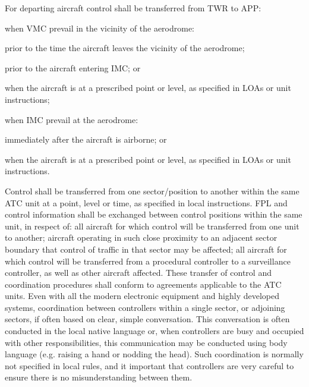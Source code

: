 For departing aircraft control shall be transferred from TWR to APP:
\bitem
\item when VMC prevail in the vicinity of the aerodrome:
	\bitem
	\item prior to the time the aircraft leaves the vicinity of the aerodrome;
	\item prior to the aircraft entering IMC; or
	\item when the aircraft is at a prescribed point or level, as specified in LOAs or unit instructions; 
	\eitem
\item when IMC prevail at the aerodrome:
	\bitem
	\item immediately after the aircraft is airborne; or
	\item when the aircraft is at a prescribed point or level, as specified in LOAs or unit instructions.
	\eitem
\eitem
\cite[Chapter 4.3.2]{doc4444}

Control shall be transferred from one sector/position to another within the same ATC unit at a point, level or time, as specified in local instructions.
FPL and control information shall be exchanged between control positions within the same unit, in respect of:
  all aircraft for which control will be transferred from one unit to another;
  aircraft operating in such close proximity to an adjacent sector boundary 	that control of traffic in that sector may be affected;
  all aircraft for which control will be transferred from a procedural controller 	to a surveillance controller, as well as other aircraft affected.
These transfer of control and coordination procedures shall conform to agreements applicable to the ATC units.
Even with all the modern electronic equipment and highly developed systems, coordination between controllers within a single sector, or adjoining sectors, if often based on clear, simple conversation. 
This conversation is often conducted in the local native language or, when controllers are busy and occupied with other responsibilities, this communication may be conducted using body language (e.g. raising a hand or nodding the head). 
Such coordination is normally not specified in local rules, and it important that controllers are very careful to ensure there is no misunderstanding between them.
\cite[Chapter 4.3.5, 10.1.5]{doc4444}

